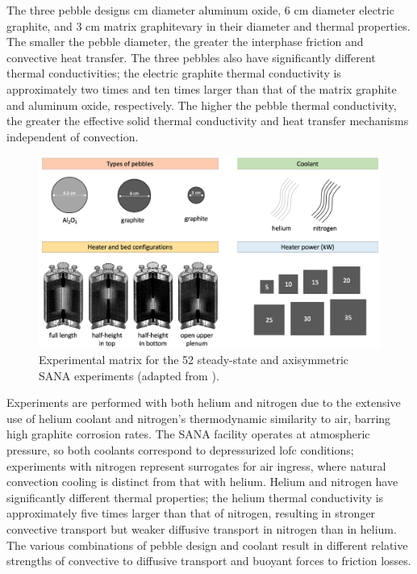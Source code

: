 The three pebble designs \si{\centi\meter} diameter aluminum oxide, 6 \si{\centi\meter} diameter electric graphite, and 3 \si{\centi\meter} matrix graphite\mdash vary in their diameter and thermal properties. The smaller the pebble diameter, the greater the interphase friction and convective heat transfer. The three pebbles also have significantly different thermal conductivities; the electric graphite thermal conductivity is approximately two times and ten times larger than that of the matrix graphite and aluminum oxide, respectively. The higher the pebble thermal conductivity, the greater the effective solid thermal conductivity and heat transfer mechanisms independent of convection.

\begin{figure}[!h]
\centering
\includegraphics[width=0.9\linewidth]{figs/sana_permutation.png}
\caption{Experimental matrix for the 52 steady-state and axisymmetric SANA experiments (adapted from \cite{SANA}).}
\label{fig:sana_permutation}
\end{figure}

Experiments are performed with both helium and nitrogen due to the extensive use of helium coolant and nitrogen's thermodynamic similarity to air, barring high graphite corrosion rates. The SANA facility operates at atmospheric pressure, so both coolants correspond to depressurized \gls{lofc} conditions; experiments with nitrogen represent surrogates for air ingress, where natural convection cooling is distinct from that with helium. Helium and nitrogen have significantly different thermal properties; the helium thermal conductivity is approximately five times larger than that of nitrogen, resulting in stronger convective transport but weaker diffusive transport in nitrogen than in helium. The various combinations of pebble design and coolant result in different relative strengths of convective to diffusive transport and buoyant forces to friction losses. 

